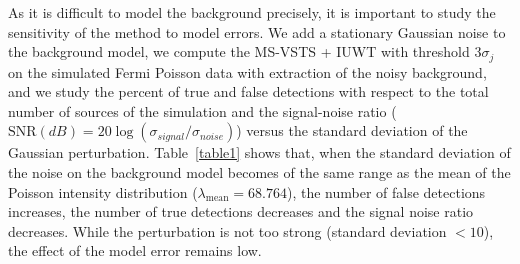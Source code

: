 As it is difficult to model the background precisely, it is important to study the sensitivity of the method to model errors. We add a stationary Gaussian noise to the background model, we compute the MS-VSTS + IUWT with threshold $3\sigma_j$ on the simulated Fermi Poisson data with extraction of the noisy background, and we study the percent of true and false detections with respect to the total number of sources of the simulation and the signal-noise ratio ($\text{SNR} (dB) = 20 \log (\sigma_{signal} / \sigma_{noise})$) versus the standard deviation of the Gaussian perturbation. Table~\ref{table1} shows that, when the standard deviation of the noise on the background model becomes of the same range as the mean of the Poisson intensity distribution ($\lambda_{\text{mean}} = 68.764$), the number of false detections increases, the number of true detections decreases and the signal noise ratio decreases. While the perturbation is not too strong (standard deviation $< 10$), the effect of the model error remains low.

